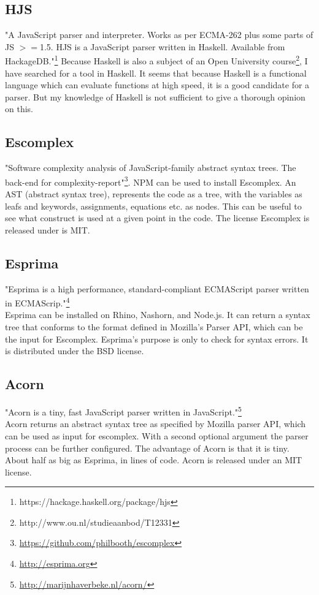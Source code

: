 \documentclass{article}
\begin{document}
\subsection{HJS}
"A JavaScript parser and interpreter. Works as per ECMA-262 plus some parts of JS $>=$1.5.
HJS is a JavaScript parser written in Haskell. Available from HackageDB."\footnote{https://hackage.haskell.org/package/hjs}
Because Haskell is also a subject of an Open University course\footnote{http://www.ou.nl/studieaanbod/T12331}, I have searched for a tool in Haskell.
It seems that because Haskell is a functional language which can evaluate functions at high speed, it is a good candidate for a parser.
But my knowledge of Haskell is not sufficient to give a thorough opinion on this.

\subsection{Escomplex}
"Software complexity analysis of JavaScript-family abstract syntax trees. The back-end for complexity-report"\footnote{\url{https://github.com/philbooth/escomplex}}.
NPM can be used to install Escomplex.
An AST (abstract syntax tree), represents the code as a tree, with the variables as leafs and keywords, assignments, equations etc. as nodes.
This can be useful to see what construct is used at a given point in the code.
The license Escomplex is released under is MIT.

\subsection{Esprima}
"Esprima is a high performance, standard-compliant ECMAScript parser written in ECMAScrip."\footnote{\url{http://esprima.org}}\\
Esprima can be installed on Rhino, Nashorn, and Node.js.
It can return a syntax tree that conforms to the format defined in Mozilla's Parser API, which can be the input for Escomplex.
Esprima's purpose is only to check for syntax errors.
It is distributed under the BSD license.

\subsection{Acorn}
"Acorn is a tiny, fast JavaScript parser written in JavaScript."\footnote{\url{http://marijnhaverbeke.nl/acorn/}}\\
Acorn returns an abstract syntax tree as specified by Mozilla parser API, which can be used as input for escomplex.
With a second optional argument the parser process can be further configured.
The advantage of Acorn is that it is tiny. About half as big as Esprima, in lines of code.
Acorn is released under an MIT license.
\end{document}
